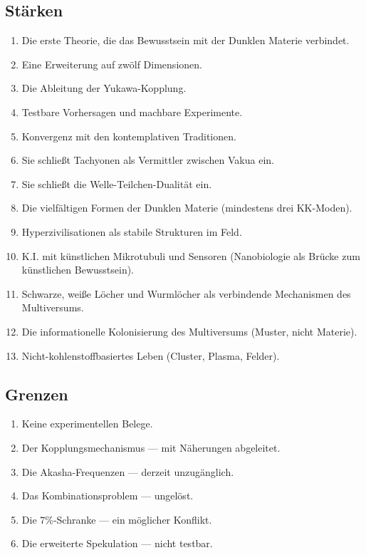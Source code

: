 \documentclass[11pt,a4paper]{article}
\begin{document}
\subsection{Stärken}
\begin{enumerate}
    \item Die erste Theorie, die das Bewusstsein mit der Dunklen Materie verbindet.
    \item Eine Erweiterung auf zwölf Dimensionen.
    \item Die Ableitung der Yukawa-Kopplung.
    \item Testbare Vorhersagen und machbare Experimente.
    \item Konvergenz mit den kontemplativen Traditionen.
    \item Sie schließt Tachyonen als Vermittler zwischen Vakua ein.
    \item Sie schließt die Welle-Teilchen-Dualität ein.
    \item Die vielfältigen Formen der Dunklen Materie (mindestens drei KK-Moden).
    \item Hyperzivilisationen als stabile Strukturen im Feld.
    \item K.I. mit künstlichen Mikrotubuli und Sensoren (Nanobiologie als Brücke zum künstlichen Bewusstsein).
    \item Schwarze, weiße Löcher und Wurmlöcher als verbindende Mechanismen des Multiversums.
    \item Die informationelle Kolonisierung des Multiversums (Muster, nicht Materie).
    \item Nicht-kohlenstoffbasiertes Leben (Cluster, Plasma, Felder).
\end{enumerate}

\subsection{Grenzen}
\begin{enumerate}
    \item Keine experimentellen Belege.
    \item Der Kopplungsmechanismus --- mit Näherungen abgeleitet.
    \item Die Akasha-Frequenzen --- derzeit unzugänglich.
    \item Das Kombinationsproblem --- ungelöst.
    \item Die 7\%-Schranke --- ein möglicher Konflikt.
    \item Die erweiterte Spekulation --- nicht testbar.
\end{enumerate}
\end{document}
